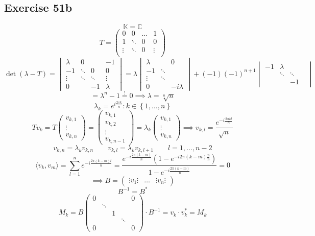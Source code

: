 \documentclass[a4paper]{article}
\theoremstyle{definition}
\newcommand\set[1]{\left\{#1\right\}}
\begin{document}
\subsection{Exercise 51b}
\[ \mathbb K = \mathbb C \]
\[
  T = \begin{pmatrix}
    0 & 0 & \ldots & 1 \\
    1 & \ddots & 0 & 0 \\
    \vdots & \ddots & 0 & \vdots \\
  \end{pmatrix}
\]
\[ \det(\lambda - T) = \begin{vmatrix} \lambda & 0 & & -1 \\ -1 & \ddots & 0 & 0 \\ \vdots & \ddots & \ddots & \vdots \\ 0 & & -1 & \lambda \end{vmatrix} = \lambda \begin{vmatrix} \lambda & & 0 \\ -1 & \ddots & \\ \vdots & \ddots & \\ 0 & & -i\lambda \end{vmatrix} + (-1)(-1)^{n+1} \begin{vmatrix} -1 & \lambda & &  \\ & \ddots & \ddots & \\ & & -1 \end{vmatrix} \]
\[ = \lambda^n - 1 \overset!= 0 \implies \lambda = \sqrt[n]{n} \]
\[ \lambda_k = e^{i \frac{2\pi k}{n}}: k \in \set{1,\dots,n} \]
\[ T v_{k} = T\begin{pmatrix} v_{k,1} \\ \vdots \\ v_{k,n} \end{pmatrix} = \begin{pmatrix} v_{k,1} \\ v_{k,2} \\ \vdots \\ v_{k,n-1} \end{pmatrix} = \lambda_k \begin{pmatrix} v_{k,1} \\ \vdots \\ v_{k,n} \end{pmatrix} \implies v_{k,l} = \frac{e^{-i \frac{2\pi kl}{n}}}{\sqrt{n}} \]
\[ v_{k,n} = \lambda_k v_{k,n} \qquad v_{k,l} = \lambda_k v_{k,l+1} \qquad l = 1, \dots, n-2 \]
\[ \langle v_k, v_m\rangle = \sum_{l=1}^n e^{-i \frac{2\pi (k-m) l}{n}} = \frac{e^{-i \frac{2\pi (k-m)}{n}} \left(1 - e^{-i 2\pi (k-m) \frac nn}\right)}{1 - e^{-i \frac{2\pi(k-m)}{n}}} = 0 \]
\[ \implies B = \begin{pmatrix} \vdots v_1 \vdots & \dots & \vdots v_n \vdots \end{pmatrix} \]
\[ B^{-1} = B^* \]
\[ M_k = B\begin{pmatrix} 0 & & & & 0 \\ & \ddots & & & \\ & & 1 & & \\ & & & \ddots & \\ 0 & & & & 0 \end{pmatrix} \cdot B^{-1} = v_k \cdot v_k^* = M_k \]
\end{document}
